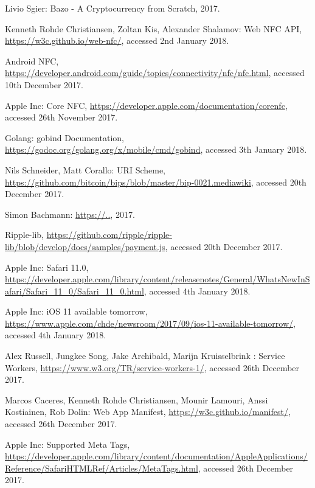\begin{thebibliography}{99}

 Livio Sgier: Bazo - A Cryptocurrency from Scratch, 2017.

 Kenneth Rohde Christiansen, Zoltan Kis, Alexander Shalamov: Web NFC API, \url{https://w3c.github.io/web-nfc/}, accessed 2nd January 2018.


 Android NFC, \url{https://developer.android.com/guide/topics/connectivity/nfc/nfc.html}, accessed 10th December 2017.

 Apple Inc: Core NFC, \url{https://developer.apple.com/documentation/corenfc}, accessed 26th November 2017.

 Golang: gobind Documentation, \url{https://godoc.org/golang.org/x/mobile/cmd/gobind}, accessed 3th January 2018.

 Nils Schneider, Matt Corallo: URI Scheme, \url{https://github.com/bitcoin/bips/blob/master/bip-0021.mediawiki}, accessed 20th December 2017.

 Simon Bachmann:  \url{https://..}, 2017.

 Ripple-lib, \url{https://github.com/ripple/ripple-lib/blob/develop/docs/samples/payment.js}, accessed 20th December 2017.

 Apple Inc: Safari 11.0,   \url{https://developer.apple.com/library/content/releasenotes/General/WhatsNewInSafari/Safari_11_0/Safari_11_0.html}, accessed 4th January 2018.

 Apple Inc: iOS 11 available tomorrow,  \url{https://www.apple.com/chde/newsroom/2017/09/ios-11-available-tomorrow/}, accessed 4th January 2018.

 Alex Russell, Jungkee Song, Jake Archibald, Marijn Kruisselbrink : Service Workers, \url{https://www.w3.org/TR/service-workers-1/}, accessed 26th December 2017.

 Marcos Caceres, 
Kenneth Rohde Christiansen, Mounir Lamouri, Anssi Kostiainen, Rob Dolin: Web App Manifest, \url{https://w3c.github.io/manifest/}, accessed 26th December 2017.

 Apple Inc: Supported Meta Tags,  \url{https://developer.apple.com/library/content/documentation/AppleApplications/Reference/SafariHTMLRef/Articles/MetaTags.html}, accessed 26th December 2017.


\end{thebibliography}
